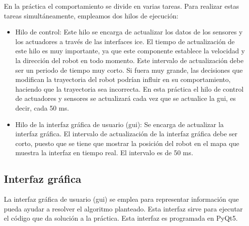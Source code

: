 En la práctica el comportamiento se divide en varias tareas. Para realizar estas tareas simultáneamente, empleamos dos hilos de ejecución:

\begin{itemize}
\item Hilo de control: Este hilo se encarga de actualizar los datos de los sensores y los actuadores a través de las interfaces \acrshort{ice}. El tiempo de actualización de este hilo es muy importante, ya que este componente establece la velocidad y la dirección del robot en todo momento. Este intervalo de actualización debe ser un periodo de tiempo muy corto. Si fuera muy grande, las decisiones que modifican la trayectoria del robot podrían influir en su comportamiento, haciendo que la trayectoria sea incorrecta. En esta práctica el hilo de control de actuadores y sensores se actualizará cada vez que se actualice la \acrshort{gui}, es decir, cada 50 ms.
\item	Hilo de la interfaz gráfica de usuario (\acrshort{gui}): Se encarga de actualizar la interfaz gráfica. El intervalo de actualización de la interfaz gráfica debe ser corto, puesto que se tiene que mostrar la posición del robot en el mapa que muestra la interfaz en tiempo real. El intervalo es de 50 ms.

\end{itemize}

\subsection{Interfaz gráfica}
La interfaz gráfica de usuario (\acrshort{gui}) se emplea para representar información que pueda ayudar a resolver el algoritmo planteado. Esta interfaz sirve para ejecutar el código que da solución a la práctica. Esta interfaz es programada en PyQt5.\\

